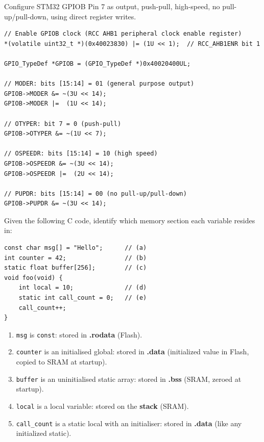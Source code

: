 \begin{example}
Configure STM32 GPIOB Pin 7 as output, push-pull, high-speed, no pull-up/pull-down, using direct register writes.

\begin{solution}
\begin{lstlisting}[style=C, numbers=none]
// Enable GPIOB clock (RCC AHB1 peripheral clock enable register)
*(volatile uint32_t *)(0x40023830) |= (1U << 1);  // RCC_AHB1ENR bit 1

GPIO_TypeDef *GPIOB = (GPIO_TypeDef *)0x40020400UL;

// MODER: bits [15:14] = 01 (general purpose output)
GPIOB->MODER &= ~(3U << 14);
GPIOB->MODER |=  (1U << 14);

// OTYPER: bit 7 = 0 (push-pull)
GPIOB->OTYPER &= ~(1U << 7);

// OSPEEDR: bits [15:14] = 10 (high speed)
GPIOB->OSPEEDR &= ~(3U << 14);
GPIOB->OSPEEDR |=  (2U << 14);

// PUPDR: bits [15:14] = 00 (no pull-up/pull-down)
GPIOB->PUPDR &= ~(3U << 14);
\end{lstlisting}
\end{solution}
\end{example}

\begin{example}
Given the following C code, identify which memory section each variable resides in:
\begin{lstlisting}[style=C, numbers=none]
const char msg[] = "Hello";      // (a)
int counter = 42;                // (b)
static float buffer[256];        // (c)
void foo(void) {
    int local = 10;              // (d)
    static int call_count = 0;   // (e)
    call_count++;
}
\end{lstlisting}

\begin{solution}
\begin{enumerate}[label=(\alph*)]
  \item \texttt{msg} is \texttt{const}: stored in \textbf{.rodata} (Flash).
  \item \texttt{counter} is an initialised global: stored in \textbf{.data} (initialized value in Flash, copied to SRAM at startup).
  \item \texttt{buffer} is an uninitialised static array: stored in \textbf{.bss} (SRAM, zeroed at startup).
  \item \texttt{local} is a local variable: stored on the \textbf{stack} (SRAM).
  \item \texttt{call\_count} is a static local with an initialiser: stored in \textbf{.data} (like any initialized static).
\end{enumerate}
\end{solution}
\end{example}

